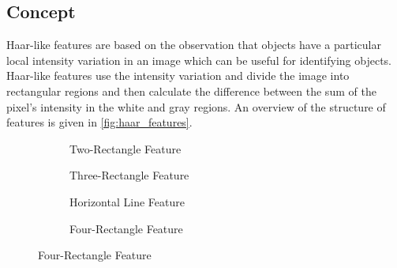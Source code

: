 \subsection{Concept}
Haar-like features \cite{viola_rapid_nodate} are based on the observation that objects have a particular local intensity variation in an image which can be useful for identifying objects. Haar-like features use the intensity variation and divide the image into rectangular regions and then calculate the difference between the sum of the pixel's intensity in the white and gray regions. An overview of the structure of features is given in \ref{fig:haar_features}.
\begin{figure}[h]
    \centering
    
    \begin{subfigure}{0.45\textwidth}
        \centering
        \caption{Two-Rectangle Feature}
        \label{fig:haar_feature_1}
    \end{subfigure}
    \hfill
    \begin{subfigure}{0.45\textwidth}
        \centering
        \caption{Three-Rectangle Feature}
        \label{fig:haar_feature_2}
    \end{subfigure}
    
    \vspace{1.5em}
    
    \begin{subfigure}{0.45\textwidth}
        \centering
        \caption{Horizontal Line Feature}
        \label{fig:haar_feature_3}
    \end{subfigure}
    \hfill
    \begin{subfigure}{0.45\textwidth}
        \centering
        \caption{Four-Rectangle Feature}
        \label{fig:haar_feature_4}
    \end{subfigure}
    

\end{figure}
